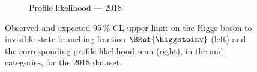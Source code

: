 \begin{figure}[htbp]
\begin{subfigure}[t]{0.45\textwidth}
        \caption{Profile likelihood --- 2018}
    \end{subfigure}
    \caption[Observed and expected 95\,\% CL upper limit on the Higgs boson to invisible state branching fraction $\BRof{\higgstoinv}$ and the corresponding profile likelihood scan, in the \ttH and \VH categories, for the 2018 dataset]{Observed and expected 95\,\% CL upper limit on the Higgs boson to invisible state branching fraction $\BRof{\higgstoinv}$ (left) and the corresponding profile likelihood scan (right), in the \ttH and \VH categories, for the 2018 dataset.}
    \label{fig:htoinv_limit_likelihood_2018}
\end{figure}
